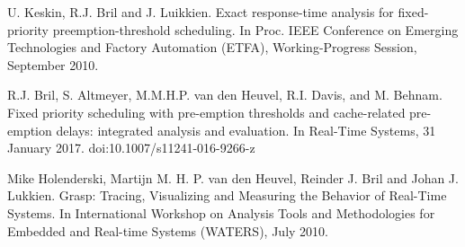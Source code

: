\documentclass[fleqn]{article}
\begin{document}
\begin{thebibliography}{10}
	U. Keskin, R.J. Bril and J. Luikkien.
	Exact response-time analysis for fixed-priority preemption-threshold scheduling.
	In Proc. IEEE Conference on Emerging Technologies and Factory Automation (ETFA), Working-Progress Session, September 2010.
	
	R.J. Bril, S. Altmeyer, M.M.H.P. van den Heuvel, R.I. Davis, and M. Behnam.
	Fixed priority scheduling with pre-emption thresholds and cache-related pre-emption delays: integrated analysis and evaluation.
	In Real-Time Systems, 31 January 2017.	
	doi:10.1007/s11241-016-9266-z
	
	Mike Holenderski, Martijn M. H. P. van den Heuvel, Reinder J. Bril and Johan J. Lukkien.
	Grasp: Tracing, Visualizing and Measuring the Behavior of Real-Time Systems.
	In International Workshop on Analysis Tools and Methodologies for Embedded and Real-time Systems (WATERS), July 2010.
	
	
\end{thebibliography}
\end{document}
